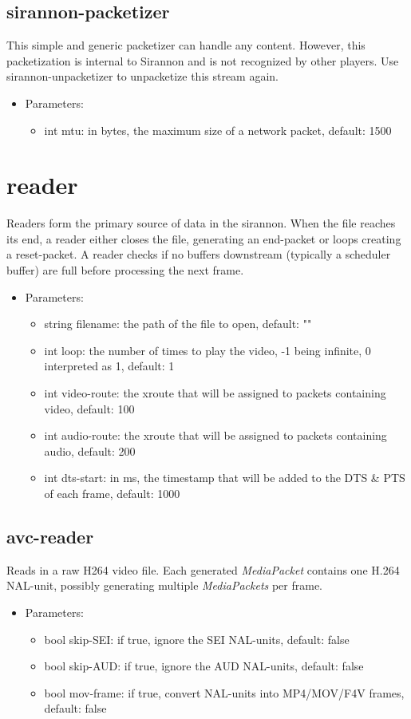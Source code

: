 \subsection{sirannon-packetizer}
This simple and generic packetizer can handle any content. However, this packetization is internal to Sirannon and is not recognized by other players. Use sirannon-unpacketizer to unpacketize this stream again.
\begin{itemize}
\item Parameters:
\begin{itemize}
\item int mtu: in bytes, the maximum size of a network packet, default: 1500
\end{itemize}
\end{itemize}
\newpage
\section{reader}
Readers form the primary source of data in the sirannon. When the file reaches its end, a reader either closes the file, generating an end-packet or loops creating a reset-packet. A reader checks if no buffers downstream (typically a scheduler buffer) are full before processing the next frame.
\begin{itemize}
\item Parameters:
\begin{itemize}
\item string filename: the path of the file to open, default: ""
\item int loop: the number of times to play the video, -1 being infinite, 0 interpreted as 1, default: 1
\item int video-route: the xroute that will be assigned to packets containing video, default: 100
\item int audio-route: the xroute that will be assigned to packets containing audio, default: 200
\item int dts-start: in ms, the timestamp that will be added to the DTS \& PTS of each frame, default: 1000
\end{itemize}
\end{itemize}
\subsection{avc-reader}
Reads in a raw H264 video file. Each generated \textit{MediaPacket} contains one H.264 NAL-unit, possibly generating multiple \textit{MediaPackets} per frame.
\begin{itemize}
\item Parameters:
\begin{itemize}
\item bool skip-SEI: if true, ignore the SEI NAL-units, default: false
\item bool skip-AUD: if true, ignore the AUD NAL-units, default: false
\item bool mov-frame: if true, convert NAL-units into MP4/MOV/F4V frames, default: false
\end{itemize}
\end{itemize}
